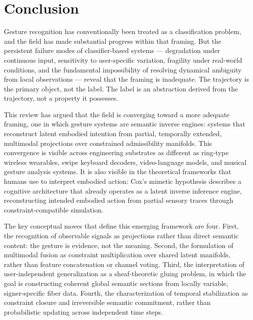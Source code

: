 \documentclass[11pt, a4paper]{article}
\theoremstyle{definition}
\begin{document}
\section{Conclusion}

Gesture recognition has conventionally been treated as a classification problem, and the field has made substantial progress within that framing. But the persistent failure modes of classifier-based systems --- degradation under continuous input, sensitivity to user-specific variation, fragility under real-world conditions, and the fundamental impossibility of resolving dynamical ambiguity from local observations --- reveal that the framing is inadequate. The trajectory is the primary object, not the label. The label is an abstraction derived from the trajectory, not a property it possesses.

This review has argued that the field is converging toward a more adequate framing, one in which gesture systems are semantic inverse engines: systems that reconstruct latent embodied intention from partial, temporally extended, multimodal projections over constrained admissibility manifolds. This convergence is visible across engineering substrates as different as ring-type wireless wearables, swipe keyboard decoders, video-language models, and musical gesture analysis systems. It is also visible in the theoretical frameworks that humans use to interpret embodied action: Cox's mimetic hypothesis describes a cognitive architecture that already operates as a latent inverse inference engine, reconstructing intended embodied action from partial sensory traces through constraint-compatible simulation.

The key conceptual moves that define this emerging framework are four. First, the recognition of observable signals as projections rather than direct semantic content: the gesture is evidence, not the meaning. Second, the formulation of multimodal fusion as constraint multiplication over shared latent manifolds, rather than feature concatenation or channel voting. Third, the interpretation of user-independent generalization as a sheaf-theoretic gluing problem, in which the goal is constructing coherent global semantic sections from locally variable, signer-specific fiber data. Fourth, the characterization of temporal stabilization as constraint closure and irreversible semantic commitment, rather than probabilistic updating across independent time steps.
\end{document}
